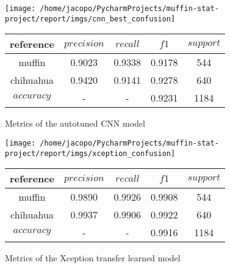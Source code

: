 
\begin{figure}
    \centering
    \texttt{[image: /home/jacopo/PycharmProjects/muffin-stat-project/report/imgs/cnn\_best\_confusion]}
    \begin{tabular}{ c | c | c | c| c}
        \hline
        reference  & $precision$ & $recall$ & $f1$   & $support$ \\
        \hline\hline
        muffin     & 0.9023      & 0.9338   & 0.9178 & 544       \\
        \hline
        chihuahua  & 0.9420      & 0.9141   & 0.9278 & 640       \\
        \hline
        $accuracy$ & -           & -        & 0.9231 & 1184      \\
        \hline
    \end{tabular}
    \caption{
        Metrics of the autotuned CNN model
    }\label{fig:figure4}
\end{figure}

\begin{figure}
    \centering
    \texttt{[image: /home/jacopo/PycharmProjects/muffin-stat-project/report/imgs/xception\_confusion]}
    \begin{tabular}{ c | c | c | c| c}
        \hline
        reference  & $precision$ & $recall$ & $f1$   & $support$ \\
        \hline\hline
        muffin     & 0.9890      & 0.9926   & 0.9908 & 544       \\
        \hline
        chihuahua  & 0.9937      & 0.9906   & 0.9922 & 640       \\
        \hline
        $accuracy$ & -           & -        & 0.9916 & 1184      \\
        \hline
    \end{tabular}
    \caption{
        Metrics of the Xception transfer learned model
    }\label{fig:figure5}
\end{figure}


